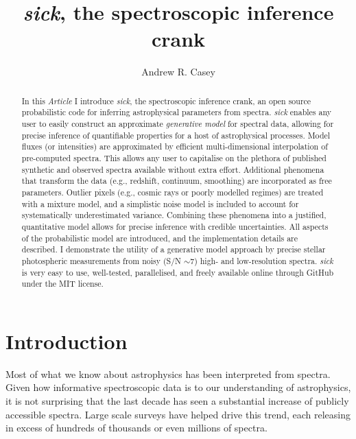 \documentclass{aastex}
\newcommand{\sick}{\textit{sick}}
\newcommand{\article}{\textit{Article}}
\begin{document}
\title{\sick, the spectroscopic inference crank}

\author{Andrew R. Casey}





\begin{abstract}
In this \article{} I introduce \sick{}, the spectroscopic inference crank, an open source probabilistic code for inferring astrophysical parameters from spectra. \sick{} enables any user to easily construct an approximate \textit{generative model} for spectral data, allowing for precise inference of quantifiable properties for a host of astrophysical processes. Model fluxes (or intensities) are approximated by efficient multi-dimensional interpolation of pre-computed spectra. This allows any user to capitalise on the plethora of published synthetic and observed spectra available without extra effort. Additional phenomena that transform the data (e.g., redshift, continuum, smoothing) are incorporated as free parameters. Outlier pixels (e.g., cosmic rays or poorly modelled regimes) are treated with a mixture model, and a simplistic noise model is included to account for systematically underestimated variance. Combining these phenomena into a justified, quantitative model allows for precise inference with credible uncertainties. All aspects of the probabilistic model are introduced, and the implementation details are described. I demonstrate the utility of a generative model approach by precise stellar photospheric measurements from noisy (S/N $\sim{} 7$) high- and low-resolution spectra. \sick{} is very easy to use, well-tested, parallelised, and freely available online through GitHub under the MIT license. 
\end{abstract}

\section{Introduction}
Most of what we know about astrophysics has been interpreted from spectra. Given how informative spectroscopic data is to our understanding of astrophysics, it is not surprising that the last decade has seen a substantial increase of publicly accessible spectra. Large scale surveys have helped drive this trend, each releasing in excess of hundreds of thousands \citep[e.g.,][]{wigglez,boss,segue,rave} or even millions \citep{lamost,galah} of spectra.
 
\end{document}
